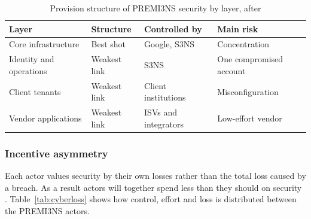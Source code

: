\begin{table}[ht]
\centering
\small
\caption{Provision structure of PREMI3NS security by layer, after \textcite{varian2004}}
\label{tab:provision}
\begin{tabularx}{\linewidth}{>{\raggedright\arraybackslash}p{3.4cm}>{\raggedright\arraybackslash}p{2.0cm}YY}
\toprule
\textbf{Layer} & \textbf{Structure} & \textbf{Controlled by} & \textbf{Main risk} \\
\midrule
Core infrastructure & Best shot & Google, S3NS & Concentration \\
Identity and operations & Weakest link & S3NS & One compromised account \\
Client tenants & Weakest link & Client institutions & Misconfiguration \\
Vendor applications & Weakest link & ISVs and integrators & Low-effort vendor \\
\bottomrule
\end{tabularx}
\end{table}

\subsubsection{Incentive asymmetry}

Each actor values security by their own losses rather than the total loss caused by a breach. As a result actors will together spend less than they should on security \parencite[slide 15]{kianpour2026slides}. Table~\ref{tab:cyberloss} shows how control, effort and loss is distributed between the PREMI3NS actors.

